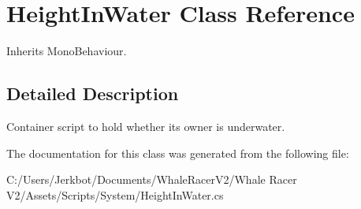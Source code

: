 \hypertarget{class_height_in_water}{}\section{Height\+In\+Water Class Reference}
\label{class_height_in_water}


Inherits Mono\+Behaviour.



\subsection{Detailed Description}
Container script to hold whether its owner is underwater. 



The documentation for this class was generated from the following file\+:\begin{DoxyCompactItemize}
\item 
C\+:/\+Users/\+Jerkbot/\+Documents/\+Whale\+Racer\+V2/\+Whale Racer V2/\+Assets/\+Scripts/\+System/Height\+In\+Water.\+cs\end{DoxyCompactItemize}
